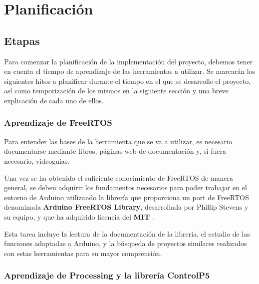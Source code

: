 \chapter{Planificación}


\noindent{}
\section{Etapas}

Para comenzar la planificación de la implementación del proyecto, debemos tener en cuenta el tiempo de aprendizaje de las herramientas a utilizar. Se marcarán los siguientes hitos a planificar durante el tiempo en el que se desarrolle el proyecto, así como temporización de los mismos en la siguiente sección y una breve explicación de cada uno de ellos. 

\subsection{Aprendizaje de FreeRTOS}

Para entender las bases de la herramienta que se va a utilizar, es necesario documentarse mediante libros, páginas web de documentación y, si fuera necesario, videoguías.

 Una vez se ha obtenido el suficiente conocimiento de FreeRTOS de manera general, se deben adquirir los fundamentos necesarios para poder trabajar en el entorno de Arduino utilizando la librería que proporciona un port de FreeRTOS denominada \textbf{Arduino FreeRTOS Library}, desarrollada por Phillip Stevens y su equipo, y que ha adquirido licencia del \textbf{MIT} \cite{freertos_arduino}. 

Esta tarea incluye la lectura de la documentación de la librería, el estudio de las funciones adaptadas a Arduino, y la búsqueda de proyectos similares realizados con estas herramientas para su mayor comprensión.

\subsection{Aprendizaje de Processing y la librería ControlP5}

